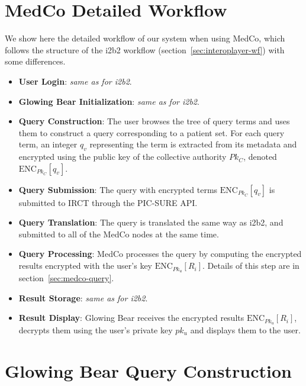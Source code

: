 \section{MedCo Detailed Workflow}

We show here the detailed workflow of our system when using MedCo, which follows the structure of the i2b2 workflow (section~\ref{sec:interoplayer-wf}) with some differences.


\begin{itemize}
\item \textbf{User Login}: \emph{same as for i2b2}.

\item \textbf{Glowing Bear Initialization}: \emph{same as for i2b2}.

\item \textbf{Query Construction}:
The user browses the tree of query terms and uses them to construct a query corresponding to a patient set.
For each query term, an integer $q_v$ representing the term is extracted from its metadata and encrypted using the public key of the collective authority $Pk_C$, denoted $\text{ENC}_{Pk_C}[q_v]$.

\item \textbf{Query Submission}:
The query with encrypted terms $\text{ENC}_{Pk_C}[q_v]$ is submitted to IRCT through the PIC-SURE API.

\item \textbf{Query Translation}:
The query is translated the same way as i2b2, and submitted to all of the MedCo nodes at the same time.

\item \textbf{Query Processing}:
MedCo processes the query by computing the encrypted results encrypted with the user's key $\text{ENC}_{Pk_u}[R_i]$.
Details of this step are in section~\ref{sec:medco-query}.

\item \textbf{Result Storage}: \emph{same as for i2b2}.

\item \textbf{Result Display}:
Glowing Bear receives the encrypted results $\text{ENC}_{Pk_u}[R_i]$, decrypts them using the user's private key $pk_u$ and displays them to the user.
\end{itemize}


\section{Glowing Bear Query Construction}

